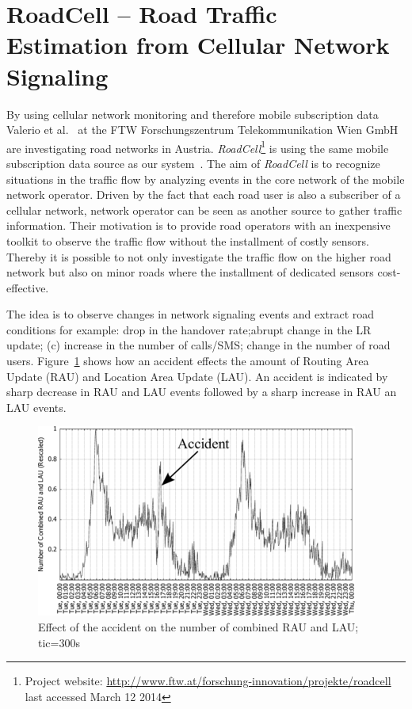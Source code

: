 \documentclass[master,english]{hgbthesis}
\begin{document}
\section{RoadCell -- Road Traffic Estimation from Cellular Network Signaling}

By using cellular network monitoring and therefore mobile subscription data Valerio et al.\ \cite{Valerio2009,Valerio20092} at the FTW Forschungszentrum Telekommunikation Wien GmbH are investigating road networks in Austria. \emph{RoadCell}\footnote{Project website: \url{http://www.ftw.at/forschung-innovation/projekte/roadcell} last accessed March 12 2014} is using the same mobile subscription data source as our system~\cite{RoadCell2009}. The aim of \emph{RoadCell} is to recognize situations in the traffic flow by analyzing events in the core network of the mobile network operator. Driven by the fact that each road user is also a subscriber of a cellular network, network operator can be seen as another source to gather traffic information. Their motivation is to provide road operators with an inexpensive toolkit to observe the traffic flow without the installment of costly sensors. Thereby it is possible to not only investigate the traffic flow on the higher road network but also on minor roads where the installment of dedicated sensors cost-effective.

The idea is to observe changes in network signaling events and extract road conditions for example: drop in the handover rate;abrupt change in the LR update; (c) increase in the number of calls/SMS; change in the number of road users. Figure~\ref{fig:raodcell_accident} shows how an accident effects the amount of Routing Area Update (RAU) and Location Area Update (LAU). An accident is indicated by sharp decrease in RAU and LAU events followed by a sharp increase in RAU an LAU events.

\begin{figure}

\centering

\includegraphics[width=0.7\linewidth]{./images/raodcell_accident.png}

\caption{Effect of the accident on the number of combined RAU and LAU; tic=300s \cite{Valerio20092}}

\label{fig:raodcell_accident}

\end{figure}
\end{document}
